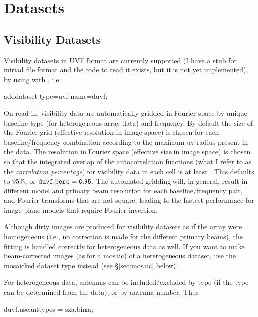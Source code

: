 \section{Datasets}

\subsection{Visibility Datasets}
\label{sec:vis}

Visibility datasets in UVF format are currently supported (I have a
stub for miriad file format and the code to read it exists, but it is
not yet implemented), by using  with , i.e.:

\begin{myindentpar}{3cm}
adddataset type=uvf name=duvf;
\end{myindentpar}

On read-in, visibility data are automatically gridded in Fourier space
by unique baseline type (for heterogeneous array data) and frequency.
By default the size of the Fourier grid (effective resolution in image
space) is chosen for each baseline/frequency combination according to
the maximum uv radius present in the data.  The resolution in Fourier
space (effective size in image space) is chosen so that the integrated
overlap of the autocorrelation functions (what I refer to as the {\it
  correlation percentage}) for visibility data in each cell is at
least .  This defaults to $95\%$, or
${\tt duvf.perc=0.95}$.  The automated gridding will, in general,
result in different model and primary beam resolution for each
baseline/frequency pair, and Fourier transforms that are not square,
leading to the fastest performance for image-plane models that require
Fourier inversion.

Although dirty images are produced for visibility datasets as if the
array were homogeneous (i.e., no correction is made for the different
primary beams), the fitting is handled correctly for heterogeneous
data as well.  If you want to make beam-corrected images (as for a
mosaic) of a heterogeneous dataset, use the mosaicked dataset type
instead (see \S\ref{sec:mosaic} below).

For heterogeneous data, antennas can be included/excluded by type (if
the type can be determined from the data), or by antenna number.  Thus

\begin{myindentpar}{3cm}
duvf.useanttypes = sza,bima;
\end{myindentpar}

